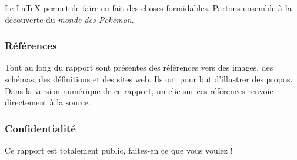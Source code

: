 \documentclass[../main.tex]{subfiles}
\begin{document}

Le LaTeX permet de faire en fait des choses formidables. Partons ensemble à la découverte du \textit{monde des Pokémon}. \\

\subsubsection{Références}
Tout au long du rapport sont présentes des références vers des images, des schémas, des définitions et des sites web. Ils ont pour but d'illustrer des propos. Dans la version numérique de ce rapport, un clic sur ces références renvoie directement à la source. \\

\subsubsection{Confidentialité}
Ce rapport est totalement public, faites-en ce que vous voulez !
\end{document}
